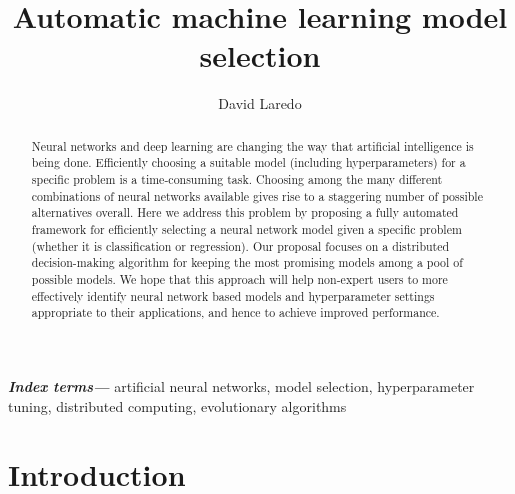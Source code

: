 \documentclass{article}
\title{Automatic machine learning model selection}
\author[1]{David Laredo}
\affil[1]{School of Mechanical Engineering, University of California, Merced}
\date{}
\providecommand{\keywords}[1]{\textbf{\textit{Index terms---}} #1}
\begin{document}
\maketitle %

\thispagestyle{fancy} %

\glsunsetall


\begin{abstract}

\noindent 

Neural networks and deep learning are changing the way that artificial intelligence is being done. Efficiently choosing a suitable model (including hyperparameters) for a specific problem is a time-consuming task. Choosing among the many different combinations of neural networks available gives rise to a staggering number of possible alternatives overall. Here we address this problem by proposing a fully automated framework for efficiently selecting a neural network model given a specific problem (whether it is classification or regression). Our proposal focuses on a distributed decision-making algorithm for keeping the most promising models among a pool of possible models. We hope that this approach will help non-expert users to more effectively identify neural network based models and hyperparameter settings appropriate to their applications, and hence to achieve improved performance.
\end{abstract}

\keywords{artificial neural networks, model selection, hyperparameter tuning, distributed computing, evolutionary algorithms}




\section{Introduction}
\label{sec:model_intro}
\end{document}
